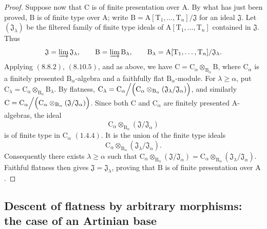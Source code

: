 \begin{proof}
Suppose now that $\mathrm{C}$ is of finite presentation over $\mathrm{A}$. By what has just been proved, $\mathrm{B}$ is of finite type over $\mathrm{A}$; write $\mathrm{B}
=\mathrm{A}[\mathrm{T}_1,\ldots,\mathrm{T}_n]/\mathfrak J$
for an ideal $\mathfrak{J}$. Let $(\mathfrak{J}_\lambda)$ be the filtered family of finite type ideals of $\mathrm{A}[\mathrm{T}_1,\ldots,\mathrm{T}_n]$ contained in $\mathfrak{J}$. Thus
\[
  \mathfrak{J}
  =\varinjlim\mathfrak{J}_\lambda,
  \qquad
  \mathrm{B}
  =\varinjlim\mathrm{B}_\lambda,
  \qquad
  \mathrm{B}_\lambda
  =\mathrm{A}[\mathrm{T}_1,\ldots,\mathrm{T}_n]/
   \mathfrak{J}_\lambda.
\]
Applying $(8.8.2)$, $(8.10.5)$, and  as above, we have $\mathrm{C}
=\mathrm{C}_\alpha\otimes_{\mathrm{B}_\alpha}\mathrm{B}$,
where $\mathrm{C}_\alpha$ is a finitely presented $\mathrm{B}_\alpha$-algebra and a faithfully flat $\mathrm{B}_\alpha$-module. For $\lambda\geqslant\alpha$, put $\mathrm{C}_\lambda
=\mathrm{C}_\alpha\otimes_{\mathrm{B}_\alpha}\mathrm{B}_\lambda$.
By flatness, $\mathrm{C}_\lambda
=
\mathrm{C}_\alpha\Big/
\Bigl(
\mathrm{C}_\alpha\otimes_{\mathrm{B}_\alpha}
(\mathfrak{J}_\lambda/
\mathfrak{J}_\alpha)
\Bigr)$,
and similarly $\mathrm{C}
=
\mathrm{C}_\alpha\Big/
\Bigl(
\mathrm{C}_\alpha\otimes_{\mathrm{B}_\alpha}
(\mathfrak{J}/
\mathfrak{J}_\alpha)
\Bigr)$.
Since both $\mathrm{C}$ and $\mathrm{C}_\alpha$ are finitely presented $\mathrm{A}$-algebras, the ideal
\[
  \mathrm{C}_\alpha\otimes_{\mathrm{B}_\alpha}
  (\mathfrak{J}/
   \mathfrak{J}_\alpha)
\]
is of finite type in $\mathrm{C}_\alpha$ $(1.4.4)$. It is the union of the finite type ideals
\[
  \mathrm{C}_\alpha\otimes_{\mathrm{B}_\alpha}
  (\mathfrak{J}_\lambda/
   \mathfrak{J}_\alpha).
\]
Consequently there exists $\lambda\geqslant\alpha$ such that $\mathrm{C}_\alpha\otimes_{\mathrm{B}_\alpha}
(\mathfrak{J}/
\mathfrak{J}_\alpha)
=
\mathrm{C}_\alpha\otimes_{\mathrm{B}_\alpha}
(\mathfrak{J}_\lambda/
\mathfrak{J}_\alpha)$.
Faithful flatness then gives
$\mathfrak J=\mathfrak J_\lambda$, proving that $\mathrm{B}$ is of finite presentation over $\mathrm{A}$.
\end{proof}

\subsection{Descent of flatness by arbitrary morphisms: the case of an Artinian base}
\label{subsection:IV.11.4}


